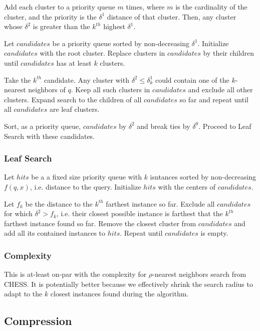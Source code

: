 Add each cluster to a priority queue $m$ times, where $m$ is the cardinality of the cluster, and the priority is the $\delta^1$ distance of that cluster. 
Then, any cluster whose $\delta^2$ is greater than the $k^{th}$ highest $\delta^1$.

Let $candidates$ be a priority queue sorted by non-decreasing $\delta^1$.
Initialize $candidates$ with the root cluster.
Replace clusters in $candidates$ by their children until $candidates$ has at least $k$ clusters.

Take the $k^{th}$ candidate.
Any cluster with $\delta^2 \leq \delta^1_k$ could contain one of the $k$-nearest neighbors of $q$.
Keep all such clusters in $candidates$ and exclude all other clusters.
Expand search to the children of all $candidates$ so far and repeat until all $candidates$ are leaf clusters.

Sort, as a priority queue, $candidates$ by $\delta^2$ and break ties by $\delta^0$.
Proceed to Leaf Search with these candidates.

\subsubsection{Leaf Search}
\label{subsubsec:methods:knn-search:leaf-search}

Let $hits$ be a a fixed size priority queue with $k$ isntances sorted by non-decreasing $f(q, x)$, i.e. distance to the query.
Initialize $hits$ with the centers of $candidates$.

Let $f_k$ be the distance to the $k^{th}$ farthest instance so far.
Exclude all $candidates$ for which $\delta^2 > f_k$, i.e. their closest possible instance is farthest that the $k^{th}$ farthest instance found so far.
Remove the closest cluster from $candidates$ and add all its contained instances to $hits$.
Repeat until $candidates$ is empty.

\subsubsection{Complexity}
\label{subsubsec:methods:knn-search:complexity}

This is at-least on-par with the complexity for $\rho$-nearest neighbors search from CHESS.
It is potentially better because we effectively shrink the search radius to adapt to the $k$ closest instances found during the algorithm.

\subsection{Compression}
\label{subsec:methods:compression}

